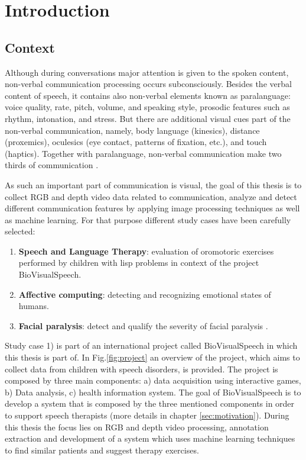 \newcommand{\unlthesis}{\emph{unlthesis}}
\newcommand{\unlthesisclass}{\texttt{unlthesis.cls}}


\chapter{Introduction}
\label{cha:introduction}

\section{Context}

Although during conversations major attention is given to the spoken content, non-verbal communication processing occurs subconsciously. Besides the verbal content of speech, it contains also non-verbal elements known as paralanguage: voice quality, rate, pitch, volume, and speaking style, prosodic features such as rhythm, intonation, and stress. But there are additional visual cues part of the non-verbal communication, namely, body language (kinesics), distance (proxemics), oculesics (eye contact, patterns of fixation, etc.), and touch (haptics). Together with paralanguage, non-verbal communication make two thirds of communication \cite{Burgoon2016}.

As such an important part of communication is visual, the goal of this thesis is to collect RGB and depth video data related to communication, analyze and detect different communication features by applying image processing techniques as well as machine learning. For that purpose different study cases have been carefully selected:
\begin{enumerate}
    \item \textbf{Speech and Language Therapy}: evaluation of oromotoric exercises performed by children with lisp problems in context of the project BioVisualSpeech.
    \item \textbf{Affective computing}: detecting and recognizing emotional states of humans.
    \item \textbf{Facial paralysis}: detect and qualify the severity of facial paralysis \cite{Ngo2016}\cite{Sundaraj2012}.
\end{enumerate}

Study case 1) is part of an international project called BioVisualSpeech in which this thesis is part of. In Fig.\ref{fig:project} an overview of the project, which aims to collect data from children with speech disorders, is provided. The project is composed by three main components: a) data acquisition using interactive games, b) Data analysis, c) health information system. The goal of BioVisualSpeech is to develop a system that is composed by the three mentioned components in order to support speech therapists (more details in chapter \ref{sec:motivation}). During this thesis the focus lies on RGB and depth video processing, annotation extraction and development of a system which uses machine learning techniques to find similar patients and suggest therapy exercises. 

